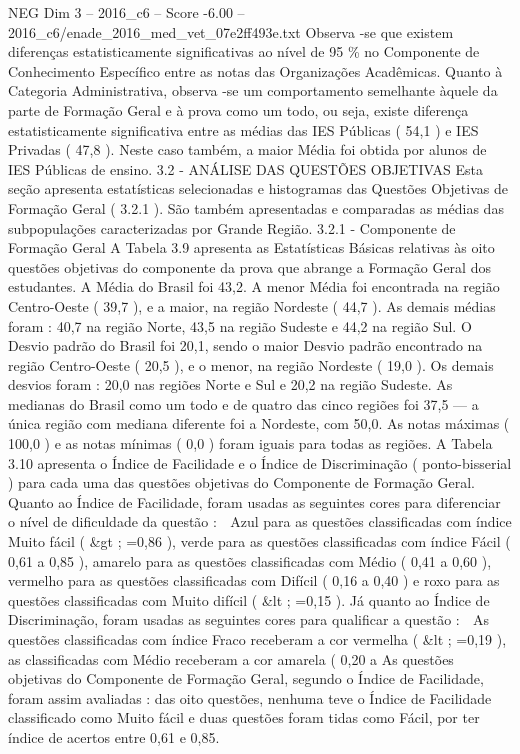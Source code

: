 \begin{textsample}{NEG Dim 3 – 2016\_c6 – Score -6.00 – 2016\_c6/enade\_2016\_med\_vet\_07e2ff493e.txt}
Observa -se que existem diferenças estatisticamente significativas ao nível de 95 \% no Componente de Conhecimento Específico entre as notas das Organizações Acadêmicas.
Quanto à Categoria Administrativa, observa -se um comportamento semelhante àquele da parte de Formação Geral e à prova como um todo, ou seja, existe diferença estatisticamente significativa entre as médias das IES Públicas ( 54,1 ) e IES Privadas ( 47,8 ).
Neste caso também, a maior Média foi obtida por alunos de IES Públicas de ensino. 3.2 - ANÁLISE DAS QUESTÕES OBJETIVAS Esta seção apresenta estatísticas selecionadas e histogramas das Questões Objetivas de Formação Geral ( 3.2.1 ).
São também apresentadas e comparadas as médias das subpopulações caracterizadas por Grande Região. 3.2.1 - Componente de Formação Geral A Tabela 3.9 apresenta as Estatísticas Básicas relativas às oito questões objetivas do componente da prova que abrange a Formação Geral dos estudantes.
A Média do Brasil foi 43,2.
A menor Média foi encontrada na região Centro-Oeste ( 39,7 ), e a maior, na região Nordeste ( 44,7 ).
As demais médias foram : 40,7 na região Norte, 43,5 na região Sudeste e 44,2 na região Sul.
O Desvio padrão do Brasil foi 20,1, sendo o maior Desvio padrão encontrado na região Centro-Oeste ( 20,5 ), e o menor, na região Nordeste ( 19,0 ).
Os demais desvios foram : 20,0 nas regiões Norte e Sul e 20,2 na região Sudeste.
As medianas do Brasil como um todo e de quatro das cinco regiões foi 37,5 — a única região com mediana diferente foi a Nordeste, com 50,0.
As notas máximas ( 100,0 ) e as notas mínimas ( 0,0 ) foram iguais para todas as regiões.
A Tabela 3.10 apresenta o Índice de Facilidade e o Índice de Discriminação ( ponto-bisserial ) para cada uma das questões objetivas do Componente de Formação Geral.
Quanto ao Índice de Facilidade, foram usadas as seguintes cores para diferenciar o nível de dificuldade da questão :  Azul para as questões classificadas com índice Muito fácil ( \&gt ; =0,86 ), verde para as questões classificadas com índice Fácil ( 0,61 a 0,85 ), amarelo para as questões classificadas com Médio ( 0,41 a 0,60 ), vermelho para as questões classificadas com Difícil ( 0,16 a 0,40 ) e roxo para as questões classificadas com Muito difícil ( \&lt ; =0,15 ).
Já quanto ao Índice de Discriminação, foram usadas as seguintes cores para qualificar a questão :  As questões classificadas com índice Fraco receberam a cor vermelha ( \&lt ; =0,19 ), as classificadas com Médio receberam a cor amarela ( 0,20 a As questões objetivas do Componente de Formação Geral, segundo o Índice de Facilidade, foram assim avaliadas : das oito questões, nenhuma teve o Índice de Facilidade classificado como Muito fácil e duas questões foram tidas como Fácil, por ter índice de acertos entre 0,61 e 0,85.

\end{textsample}
